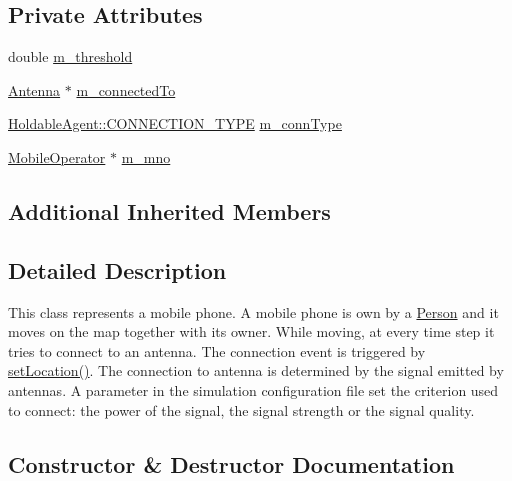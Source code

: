 \subsection*{Private Attributes}
\begin{DoxyCompactItemize}
\item 
double \hyperlink{class_mobile_phone_afb6364675f7cf6e09856f49ae6c10563}{m\+\_\+threshold}
\item 
\hyperlink{class_antenna}{Antenna} $\ast$ \hyperlink{class_mobile_phone_aa143b94346485788c3563228f6043721}{m\+\_\+connected\+To}
\item 
\hyperlink{class_holdable_agent_ae2c334b004d7b9c5a999cf2618e4e518}{Holdable\+Agent\+::\+C\+O\+N\+N\+E\+C\+T\+I\+O\+N\+\_\+\+T\+Y\+PE} \hyperlink{class_mobile_phone_a39f69fef45f380e3922dfe78b904372d}{m\+\_\+conn\+Type}
\item 
\hyperlink{class_mobile_operator}{Mobile\+Operator} $\ast$ \hyperlink{class_mobile_phone_a1b26abc840ac8f8679dd62939330c597}{m\+\_\+mno}
\end{DoxyCompactItemize}
\subsection*{Additional Inherited Members}


\subsection{Detailed Description}
This class represents a mobile phone. A mobile phone is own by a \hyperlink{class_person}{Person} and it moves on the map together with its owner. While moving, at every time step it tries to connect to an antenna. The connection event is triggered by \hyperlink{class_holdable_agent_aec98d2fe325b48d9a84ad3dad44700e0}{set\+Location()}. The connection to antenna is determined by the signal emitted by antennas. A parameter in the simulation configuration file set the criterion used to connect\+: the power of the signal, the signal strength or the signal quality. 

\subsection{Constructor \& Destructor Documentation}
\mbox{\label{class_mobile_phone_afd7beed70eb2af3baecd9521332ba8eb}} 
